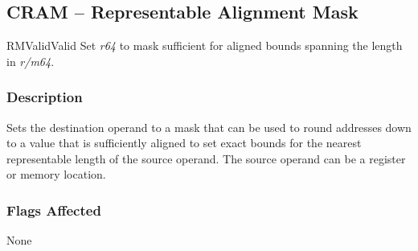 \clearpage
{}
{}
\subsection*{CRAM -- Representable Alignment Mask}

\begin{x86opcodetable}
  {RM}{Valid}{Valid}
  {Set \emph{r64} to mask sufficient for aligned bounds spanning the
    length in \emph{r/m64}.}
\end{x86opcodetable}

\begin{x86opentable}
\end{x86opentable}

\subsubsection*{Description}

Sets the destination operand to a mask that can be used to round
addresses down to a value that is sufficiently aligned to set exact
bounds for the nearest representable length of the source operand.
The source operand can be a register or memory location.

\subsubsection*{Flags Affected}

None
